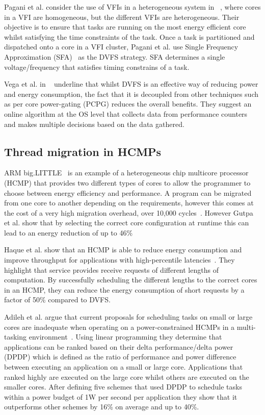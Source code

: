 Pagani et al. consider the use of VFIs in a heterogeneous system in ~\cite{paganiEECHM2017}, where cores in a VFI are homogeneous, but the different VFIs are heterogeneous.
Their objective is to ensure that tasks are running on the most energy efficient core whilst satisfying the time constraints of the task.
Once a task is partitioned and dispatched onto a core in a VFI cluster, Pagani et al. use Single Frequency Approximation (SFA)~\cite{sfaScheme} as the DVFS strategy.
SFA determines a single voltage/frequency that satisfies timing constrains of a task.


Vega et al. in ~\cite{vega2013crank} underline that whilst DVFS is an effective way of reducing power and energy consumption, the fact that it is decoupled from other techniques such as per core power-gating (PCPG) reduces the overall benefits.
They suggest an online algorithm at the OS level that collects data from performance counters and makes multiple decisions based on the data gathered.

\subsection{Thread migration in HCMPs}
ARM big.LITTLE~\cite{armbig} is an example of a heterogeneous chip multicore processor (HCMP) that provides two different types of cores to allow the programmer to choose between energy efficiency and performance.
A program can be migrated from one core to another depending on the requirements, however this comes at the cost of a very high migration overhead, over 10,000 cycles~\cite{armbig}.
However Gutpa et al. show that by selecting the correct core configuration at runtime this can lead to an energy reduction of up to 46\%

Haque et al. show that an HCMP is able to reduce energy consumption and improve throughput for applications with high-percentile latencies~\cite{tailAMP2017}.
They highlight that service provides receive requests of different lengths of computation.
By successfully scheduling the different lengths to the correct cores in an HCMP, they can reduce the energy consumption of short requests by a factor of 50\% compared to DVFS.

Adileh et al. argue that current proposals for scheduling tasks on small or large cores are inadequate when operating on a power-constrained HCMPs in a multi-tasking environment~\cite{adileh2016power}.
Using linear programming they determine that applications can be ranked based on their delta performance/delta power (DPDP) which is defined as the ratio of performance and power difference between executing an application on a small or large core.
Applications that ranked highly are executed on the large core whilst others are executed on the smaller cores.
After defining five schemes that used DPDP to schedule tasks within a power budget of 1W per second per application they show that it outperforms other schemes by 16\% on average and up to 40\%.
 
